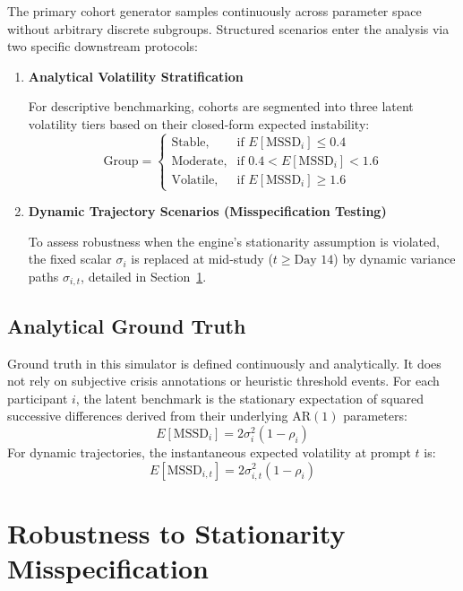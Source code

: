 \documentclass[11pt,letterpaper]{article}
\begin{document}
The primary cohort generator samples continuously across parameter space without arbitrary discrete subgroups. Structured scenarios enter the analysis via two specific downstream protocols:
\begin{enumerate}
    \item \textbf{Analytical Volatility Stratification} 
    
    For descriptive benchmarking, cohorts are segmented into three latent volatility tiers based on their closed-form expected instability:
    \begin{equation}
    \text{Group} = \begin{cases} 
    \text{Stable}, & \text{if } E[\text{MSSD}_i] \le 0.4 \\ 
    \text{Moderate}, & \text{if } 0.4 < E[\text{MSSD}_i] < 1.6 \\ 
    \text{Volatile}, & \text{if } E[\text{MSSD}_i] \ge 1.6 
    \end{cases}
    \end{equation}
    \item \textbf{Dynamic Trajectory Scenarios (Misspecification Testing)} 
    
    To assess robustness when the engine's stationarity assumption is violated, the fixed scalar $\sigma_i$ is replaced at mid-study ($t \ge \text{Day } 14$) by dynamic variance paths $\sigma_{i,t}$, detailed in Section~\ref{sec:misspecification}.
\end{enumerate}

\subsection{Analytical Ground Truth}

Ground truth in this simulator is defined continuously and analytically. It does not rely on subjective crisis annotations or heuristic threshold events. For each participant $i$, the latent benchmark is the stationary expectation of squared successive differences derived from their underlying $\text{AR}(1)$ parameters:
\begin{equation}
E[\text{MSSD}_i] = 2\sigma_i^2(1 - \rho_i)
\end{equation}
For dynamic trajectories, the instantaneous expected volatility at prompt $t$ is:
\begin{equation}
E[\text{MSSD}_{i,t}] = 2\sigma_{i,t}^2(1 - \rho_i)
\end{equation}

\section{Robustness to Stationarity Misspecification}
\label{sec:misspecification}
\end{document}
